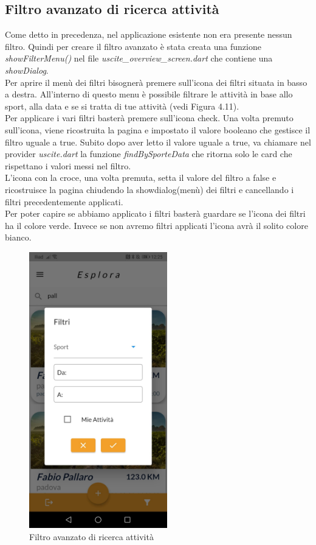 \subsection{Filtro avanzato di ricerca attività}
Come detto in precedenza, nel applicazione esistente non era presente nessun filtro. Quindi per creare il filtro avanzato è stata creata una funzione \textit{showFilterMenu()} nel file \textit{uscite\_overview\_screen.dart} che contiene una \textit{showDialog}.\\
Per aprire il menù dei filtri bisognerà premere sull'icona dei filtri situata in basso a destra.
All'interno di questo menu è possibile filtrare le attività in base allo sport, alla data e se si tratta di tue attività (vedi Figura 4.11).\\
Per applicare i vari filtri basterà premere sull'icona check.
Una volta premuto sull'icona, viene ricostruita la pagina e impostato il valore booleano che gestisce il filtro uguale a true.
Subito dopo aver letto il valore uguale a true, va chiamare nel provider \textit{uscite.dart} la funzione \textit{findBySporteData} che ritorna solo le card che rispettano i valori messi nel filtro.\\
L'icona con la croce, una volta premuta, setta il valore del filtro a false e ricostruisce la pagina chiudendo la showdialog(menù) dei filtri e cancellando i filtri precedentemente applicati.\\
Per poter capire se abbiamo applicato i filtri basterà guardare se l'icona dei filtri ha il colore verde.
Invece se non avremo filtri applicati l'icona avrà il solito colore bianco.

\begin{figure}[htbp]	
	\centering
	\includegraphics[width=6cm]{immagini/filtroavanzato.jpeg}
	\caption{Filtro avanzato di ricerca attività}
	\label{fig:Filtro avanzato di ricerca attività}
\end{figure}

